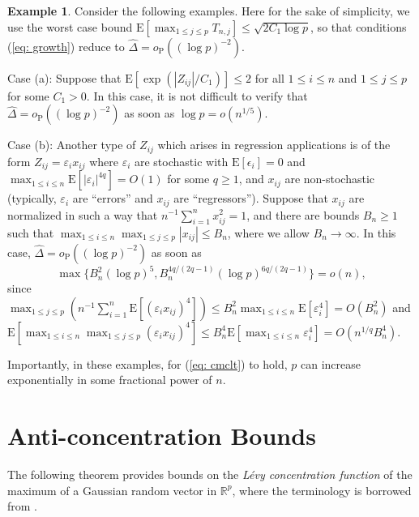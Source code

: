 \documentclass[11pt,reqno]{amsart}
\theoremstyle{definition}
\newtheorem{example}{Example}
\newcommand{\eps}{\varepsilon}
\renewcommand{\hat}{\widehat}
\newcommand{\Ep}{{\mathrm{E}}}
\renewcommand{\Pr}{{\mathrm{P}}}
\newcommand{\RR}{\mathbb{R}}
\begin{document}
\begin{example} Consider the following examples.  Here for the sake of simplicity, we use the worst case bound $\Ep [ \max_{1 \leq j \leq p} T_{n,j} ] \leq \sqrt{2 C_{1} \log p}$, so that conditions (\ref{eq: growth}) reduce to $\hat{\Delta} = o_{\Pr}((\log p)^{-2})$.

Case (a): Suppose that $\Ep [ \exp (| Z_{ij} |/ C_{1} ) ] \leq 2$ for all $1 \leq i \leq n$ and $1 \leq j \leq p$ for some $C_{1} > 0$.
In this case, it is not difficult to verify that $\hat{\Delta} = o_{\Pr}((\log p)^{-2})$ as soon as $\log p = o(n^{1/5})$.

Case (b): Another type of $Z_{ij}$ which arises in regression applications is of the form $Z_{ij} = \eps_{i} x_{ij}$ where $\eps_{i}$ are stochastic with $\Ep [ \epsilon_{i} ] = 0$ and $\max_{1 \leq i \leq n}\Ep[ | \eps_{i} |^{4q} ] = O(1)$ for some $q \geq 1$, and $x_{ij}$ are non-stochastic (typically, $\eps_{i}$ are ``errors'' and $x_{ij}$ are ``regressors'').  Suppose that $x_{ij}$ are normalized in such a way that $n^{-1} \sum_{i=1}^{n} x_{ij}^{2} = 1$, and there are bounds $B_{n} \geq 1$ such that $\max_{1 \leq i \leq n} \max_{1 \leq j \leq p} | x_{ij} | \leq B_{n}$, where we allow $B_{n} \to \infty$. In this case, $\hat{\Delta} = o_{\Pr}((\log p)^{-2})$ as soon as
\begin{equation*}
\max \{ B_{n}^{2} (\log p)^{5},  B_{n}^{4q/(2q-1)} (\log p)^{6q/(2q-1)}  \} = o(n),
\end{equation*}
since $\max_{1 \leq j \leq p} ( n^{-1}\sum_{i=1}^{n} \Ep [ (\eps_{i}  x_{ij})^{4} ]) \leq B_{n}^{2} \max_{1 \leq i \leq n} \Ep [ \eps_{i}^{4} ] = O(B_{n}^{2})$ and $\Ep [ \max_{1 \leq i \leq n} \max_{1 \leq j \leq p} (\eps_{i} x_{ij})^{4} ] \leq B_{n}^{4} \Ep[\max_{1 \leq i \leq n} \eps_{i}^{4} ] = O(n^{1/q} B_{n}^{4})$.

Importantly, in these examples, for (\ref{eq: cmclt}) to hold, $p$ can increase  exponentially in some fractional power of $n$.
\end{example}

\section{Anti-concentration Bounds}
\label{sec: anti-concentration}


The following theorem provides bounds on the {\em L\'{e}vy concentration function}
of the maximum of a Gaussian random vector in $\RR^{p}$, where the terminology is borrowed from \cite{RV09}.
\end{document}
